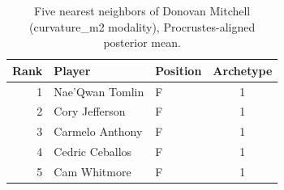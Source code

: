 \begin{table}[htbp]
  \centering\small
  \begin{tabular}{rllc}
    \toprule
    Rank & Player & Position & Archetype \\
    \midrule
    1 & Nae'Qwan Tomlin & F & 1 \\
    2 & Cory Jefferson & F & 1 \\
    3 & Carmelo Anthony & F & 1 \\
    4 & Cedric Ceballos & F & 1 \\
    5 & Cam Whitmore & F & 1 \\
    \bottomrule
  \end{tabular}
  \caption{Five nearest neighbors of Donovan Mitchell (curvature_m2 modality), Procrustes-aligned posterior mean.}
  \label{tab:Donovan_Mitchell_neighbors_curvature_m2}
\end{table}


